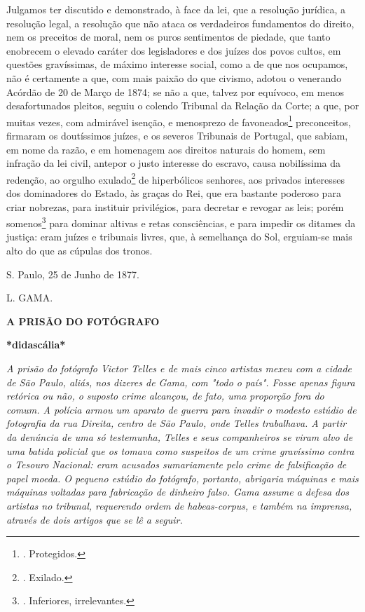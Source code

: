 Julgamos ter discutido e demonstrado, à face da lei, que a resolução
jurídica, a resolução legal, a resolução que não ataca os verdadeiros
fundamentos do direito, nem os preceitos de moral, nem os puros
sentimentos de piedade, que tanto enobrecem o elevado caráter dos
legisladores e dos juízes dos povos cultos, em questões gravíssimas, de
máximo interesse social, como a de que nos ocupamos, não é certamente a
que, com mais paixão do que civismo, adotou o venerando Acórdão de 20 de
Março de 1874; se não a que, talvez por equívoco, em menos
desafortunados pleitos, seguiu o colendo Tribunal da Relação da Corte; a
que, por muitas vezes, com admirável isenção, e menosprezo de
favoneados\footnote{. Protegidos.} preconceitos, firmaram os doutíssimos
juízes, e os severos Tribunais de Portugal, que sabiam, em nome da
razão, e em homenagem aos direitos naturais do homem, sem infração da
lei civil, antepor o justo interesse do escravo, causa nobilíssima da
redenção, ao orgulho exulado\footnote{. Exilado.} de hiperbólicos
senhores, aos privados interesses dos dominadores do Estado, às graças
do Rei, que era bastante poderoso para criar nobrezas, para instituir
privilégios, para decretar e revogar as leis; porém somenos\footnote{.
  Inferiores, irrelevantes.} para dominar altivas e retas consciências,
e para impedir os ditames da justiça: eram juízes e tribunais livres,
que, à semelhança do Sol, erguiam-se mais alto do que as cúpulas dos
tronos.

S. Paulo, 25 de Junho de 1877.

L. GAMA.

\textbf{A PRISÃO DO FOTÓGRAFO}

\textbf{*didascália*}

\emph{A prisão do fotógrafo Victor Telles e de mais cinco artistas mexeu
com a cidade de São Paulo, aliás, nos dizeres de Gama, com "todo o
país". Fosse apenas figura retórica ou não, o suposto crime alcançou, de
fato, uma proporção fora do comum. A polícia armou um aparato de guerra
para invadir o modesto estúdio de fotografia da rua Direita, centro de
São Paulo, onde Telles trabalhava. A partir da denúncia de uma só
testemunha, Telles e seus companheiros se viram alvo de uma batida
policial que os tomava como suspeitos de um crime gravíssimo contra o
Tesouro Nacional: eram acusados sumariamente pelo crime de falsificação
de papel moeda. O pequeno estúdio do fotógrafo, portanto, abrigaria
máquinas e mais máquinas voltadas para fabricação de dinheiro falso.
Gama assume a defesa dos artistas no tribunal, requerendo ordem de
habeas-corpus, e também na imprensa, através de dois artigos que se lê a
seguir. }

